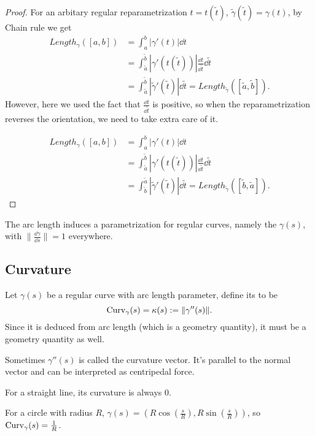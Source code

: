 \begin{proof}[Proof]
    For an arbitary regular reparametrization $t = t(\tilde{t})$,
	$\tilde{\gamma}(\tilde{t}) = \gamma(t)$,
	by Chain rule we get
	\begin{align*}
		Length_{\gamma}([a,b]) &= \int _a^b |\gamma'(t)| \dd t\\
		&= \int_{\tilde{a}}^{\tilde{b}} |\gamma'(t(\tilde{t}))|
		\frac{\dd t}{\dd \tilde{t}} \dd \tilde{t}\\
		&=\int_{\tilde{a}}^{\tilde{b}} |\tilde\gamma'(\tilde t)| \dd \tilde{t}
		= Length_{\tilde{\gamma}}([\tilde a,\tilde b]).
	\end{align*}
	However, here we used the fact that $\frac{\dd t}{\dd \tilde t}$
	is positive, so when the reparametrization reverses the orientation,
	we need to take extra care of it.

	\begin{align*}
		Length_{\gamma}([a,b]) &= \int _a^b |\gamma'(t)| \dd t\\
		&= \int_{\tilde{a}}^{\tilde{b}} |\gamma'(t(\tilde{t}))|
		\frac{\dd t}{\dd \tilde{t}} \dd \tilde{t}\\
		&=\int^{\tilde{a}}_{\tilde{b}} |\tilde\gamma'(\tilde t)| \dd \tilde{t}
		= Length_{\tilde{\gamma}}([\tilde b, \tilde a]).
	\end{align*}
\end{proof}

The arc length induces a parametrization for regular curves, namely the
 $\gamma(s)$, with $\lVert \frac{\dd\gamma}{\dd s}\rVert = 1$
everywhere.

\subsection{Curvature}
\label{sub:Curvature}
\begin{definition}[Curvature]
	Let $\gamma(s)$ be a regular curve with arc length parameter,
	define its  to be
	\[
	\operatorname{Curv}_\gamma(s) = \kappa(s) := \lVert \gamma''(s)\rVert.
	\]
	Since it is deduced from arc length (which is a geometry quantity), it
	must be a geometry quantity as well.
\end{definition}
\begin{remark}
    Sometimes $\gamma''(s)$ is called the curvature vector.
	It's parallel to the normal vector and can be interpreted as
	centripedal force.
\end{remark}

\begin{example}
    For a straight line, its curvature is always $0$.

	For a circle with radius $R$, $\gamma(s)=(R\cos(\frac{s}{R}), R\sin(\frac{s}{R}))$,
	so $\operatorname{Curv}_\gamma(s) = \frac{1}{R}$.
\end{example}

